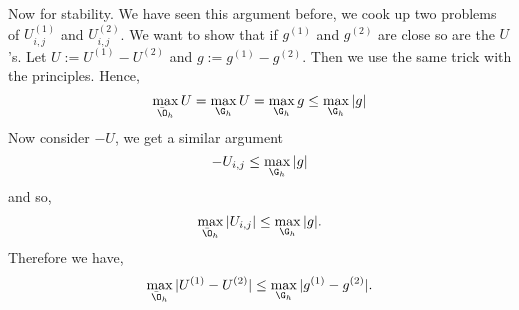 \noindent
Now for stability. We have seen this argument before, we cook up two problems of $U_{i,j}^{(1)}$ and $U_{i,j}^{(2)}$. We want to show that if $g^{(1)}$ and $g^{(2)}$ are close so are the $U$'s. Let $U := U^{(1)} - U^{(2)}$ and $g := g^{(1)} - g^{(2)}$. Then we use the same trick with the principles. Hence,
$$ \max_{\bar \O_h} U = \max_{\G_h} U = \max_{\G_h} g \le \max_{\G_h} |g| $$
Now consider $-U$, we get a similar argument
$$ -U_{i,j} \le \max_{\G_h} |g| $$
and so,
$$ \max_{\bar \O_h} |U_{i,j}|\le \max_{\G_h} |g|. $$
Therefore we have,
$$ \max_{\bar \O_h} |U^{(1)} - U^{(2)}| \le \max_{\G_h} |g^{(1)} - g^{(2)}|. $$